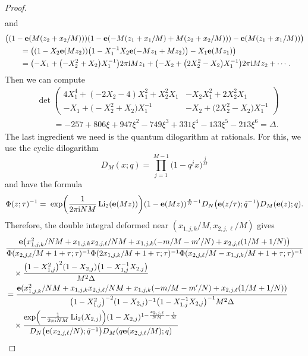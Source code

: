 \documentclass[pdftex]{sigma}
\numberwithin{equation}{section}
\def\tq{\tilde{q}}
\def\Li{\mathrm{Li}}
\def\e{\mathbf e}
\def\CYCDS{D}
\def\tq{\tilde{q}}
\def\Li{\operatorname{Li}}
\begin{document}
\begin{proof}
\begin{align*}
\end{align*}
and
\begin{align*}
&\bigl((1-\e(M(z_2+x_2/M)))(1-\e(-M(z_1+x_{1}/M)+M(z_2+x_2/M)))-\e(M(z_1+x_{1}/M))\bigr)\\
& \qquad=\bigl((1-X_2\e(Mz_2))\bigl(1-X_1^{-1}X_2\e(-Mz_1+Mz_2)\bigr)-X_{1}\e(Mz_1)\bigr)\\
& \qquad =
\bigl(-X_1 + \bigl(-X_2^2 + X_2\bigr)X_1^{-1}\bigr)2\pi {\rm i}Mz_1+\bigl(-X_2 + \bigl(2X_2^2 - X_2\bigr)X_1^{-1}\bigr)2\pi {\rm i}Mz_{2}+\cdots .
\end{align*}
Then we can compute
\begin{align*}
 &\det
 \begin{pmatrix}
 4X_1^4 + (-2X_2 - 4)X_1^2 + X_2^2X_1 & -X_2X_1^2 + 2X_2^2X_1\\
 -X_1 + \bigl(-X_2^2 + X_2\bigr)X_1^{-1} & -X_2 + \bigl(2X_2^2 - X_2\bigr)X_1^{-1}
 \end{pmatrix}\\
 &\qquad  =
 -257+806\xi+947\xi^2-749\xi^3+331\xi^4-133\xi^5-213\xi^6
  =\Delta .
\end{align*}
The last ingredient we need is the quantum dilogarithm at rationals. For this, we use the cyclic dilogarithm
\[
 \CYCDS_{M}(x;q)
  =
 \prod_{j=1}^{M-1}\bigl(1-q^{j}x\bigr)^{\frac{j}{M}}
\]
and have the formula~\cite[Theorem 1.9]{GK:rat}
\[
 \Phi(z;\tau)^{-1}
 =\;
 \exp\biggl(\frac{1}{2\pi {\rm i}NM}\Li_{2}(\e(Mz))\biggr)(1-\e(Mz))^{\frac{z}{N}-1}\CYCDS_{N}\bigl(\e(z/\tau);\tq^{-1}\bigr)\CYCDS_{M}(\e(z);q) .
\]
Therefore, the double integral deformed near $(x_{1,j,k}/M,x_{2,j,\ell}/M)$ gives
\begin{align*}
 &\frac{\e\bigl(x_{1,j,k}^2/NM+x_{1,j,k}x_{2,j,\ell}/NM+x_{1,j,k}(-m/M-m'/N)+x_{2,j,\ell}(1/M+1/N)\bigr)}{\Phi(x_{2,j,\ell}/M+1+\tau;\tau)^{-1}\Phi(2x_{1,j,k}/M+1+\tau;\tau)^{-1}\Phi(x_{2,j,\ell}/M-x_{1,j,k}/M+1+\tau;\tau)^{-1}}\\
 & \quad \times\frac{\bigl(1-X_{1,j}^2\bigr)^2(1-X_{2,j})\bigl(1-X_{1,j}^{-1}X_{2,j}\bigr)}{M^2\Delta}\\
 & =
 \frac{\e(x_{1,j,k}^2/NM+x_{1,j,k}x_{2,j,\ell}/NM+x_{1,j,k}(-m/M-m'/N)+x_{2,j,\ell}(1/M+1/N))} {\bigl(1-X_{1,j}^2\bigr)^{-2}(1-X_{2,j})^{-1}\bigl(1-X_{1,j}^{-1}X_{2,j}\bigl)^{-1}M^2\Delta}\\
 & \quad \times\frac{\exp\Bigl(-\frac{1}{2\pi {\rm i}NM}\Li_{2}(X_{2,j})\Bigr)(1-X_{2,j})^{1-\frac{x_{2,j,\ell}}{NM}-\frac{1}{M}}}{\CYCDS_{N}\bigl(\e(x_{2,j,\ell}/N);\tq^{-1}\bigr) \CYCDS_{M}(q\e(x_{2,j,\ell}/M);q)}\\

\end{align*}
\end{proof}
\end{document}
